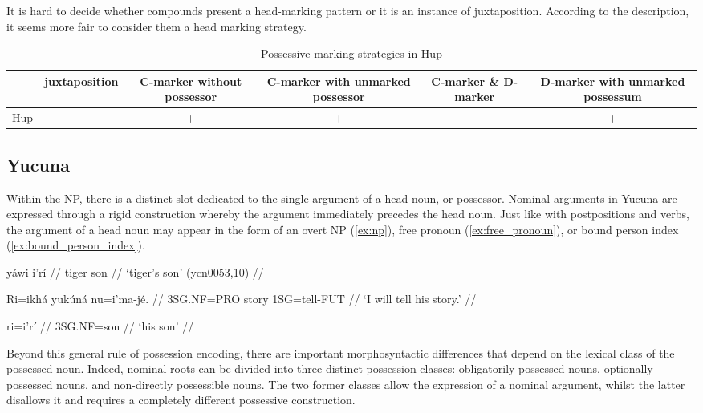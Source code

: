 It is hard to decide whether compounds present a head-marking pattern or it is an instance of juxtaposition. According to the description, it seems more fair to consider them a head marking strategy.


\begin{table}[h!]
	\centering
	\small
	\begin{tabular}{@{}cccccc@{}}
		\toprule
		& juxtaposition & \parbox{2.5cm}{C-marker without possessor} & \parbox{2.75cm}{C-marker with unmarked possessor} & \parbox{1.75cm}{C-marker \& D-marker} & \parbox{3cm}{D-marker with unmarked possessum} \\ \midrule
		Hup & - & + & + & - & + \\ \bottomrule
	\end{tabular}
	\caption{Possessive marking strategies in Hup}
\end{table}


\subsection{Yucuna}

Within the NP, there is a distinct slot dedicated to the single argument of a head noun, or possessor. Nominal arguments in Yucuna are expressed through a rigid construction whereby the argument immediately precedes the head noun. Just like with postpositions and verbs, the argument of a head noun may appear in the form of an overt NP (\ref{ex:np}), free pronoun (\ref{ex:free_pronoun}), or bound person index (\ref{ex:bound_person_index}).

\pex \label{ex:np}
\begingl
\gla yáwi i'rí //
\glb tiger son //
\glft `tiger’s son' (ycn0053,10) //
\endgl

\a\label{ex:free_pronoun}
\begingl
\gla Ri=ikhá yukúná nu=i'ma-jé. //
\glb 3SG.NF=PRO story 1SG=tell-FUT //
\glft `I will tell his story.' //
\endgl

\label{ex:bound_person_index}
\begingl
\gla ri=i'rí //
\glb 3SG.NF=son //
\glft `his son'  //
\endgl
\xe

Beyond this general rule of possession encoding, there are important morphosyntactic differences that depend on the lexical class of the possessed noun. Indeed, nominal roots can be divided into three distinct possession classes: obligatorily possessed nouns, optionally possessed nouns, and non-directly possessible nouns. The two former classes allow the expression of a nominal argument, whilst the latter disallows it and requires a completely different possessive construction. 

